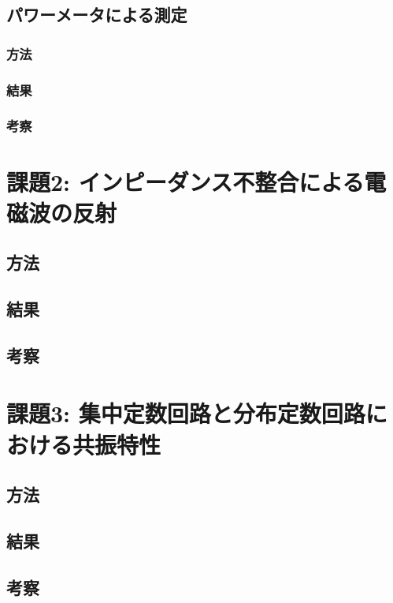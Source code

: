 \documentclass[uplatex,dvipdfmx,a4j,12pt]{jsarticle}
\begin{document}
\subsection{パワーメータによる測定}
\subsubsection{方法}

\subsubsection{結果}

\subsubsection{考察}


\section{課題2: インピーダンス不整合による電磁波の反射}
\subsection{方法}

\subsection{結果}

\subsection{考察}


\section{課題3: 集中定数回路と分布定数回路における共振特性}
\subsection{方法}

\subsection{結果}

\subsection{考察}
\end{document}
